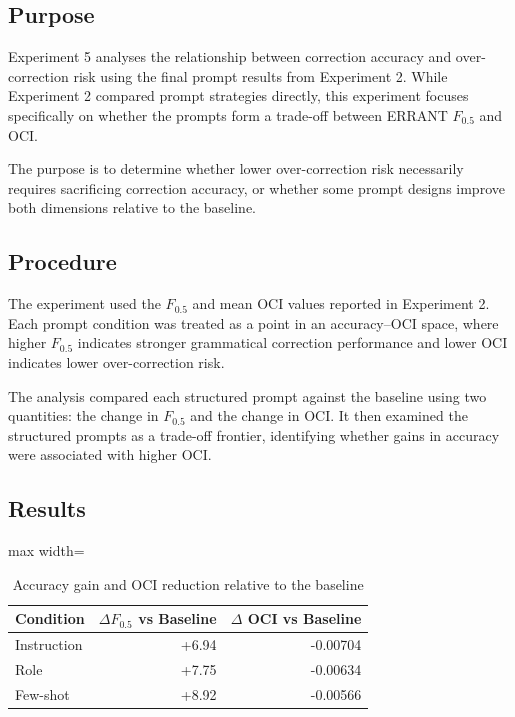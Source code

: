 \subsection{Purpose}

Experiment 5 analyses the relationship between correction accuracy and over-correction risk using the final prompt results from Experiment 2. While Experiment 2 compared prompt strategies directly, this experiment focuses specifically on whether the prompts form a trade-off between ERRANT $F_{0.5}$ and OCI.

The purpose is to determine whether lower over-correction risk necessarily requires sacrificing correction accuracy, or whether some prompt designs improve both dimensions relative to the baseline.

\subsection{Procedure}

The experiment used the $F_{0.5}$ and mean OCI values reported in Experiment 2. Each prompt condition was treated as a point in an accuracy--OCI space, where higher $F_{0.5}$ indicates stronger grammatical correction performance and lower OCI indicates lower over-correction risk.

The analysis compared each structured prompt against the baseline using two quantities: the change in $F_{0.5}$ and the change in OCI. It then examined the structured prompts as a trade-off frontier, identifying whether gains in accuracy were associated with higher OCI.

\subsection{Results}

\begin{table}[htbp]
    \centering
    \caption{Accuracy gain and OCI reduction relative to the baseline}
    \label{tab:exp5_baseline_deltas}
    \renewcommand{\arraystretch}{1.15}
    \begin{adjustbox}{max width=\textwidth}
    \begin{tabular}{lrr}
        \toprule
        \textbf{Condition} & \textbf{$\Delta F_{0.5}$ vs Baseline} & \textbf{$\Delta$ OCI vs Baseline} \\
        \midrule
        Instruction & +6.94 & -0.00704 \\
        Role        & +7.75 & -0.00634 \\
        Few-shot    & +8.92 & -0.00566 \\
        \bottomrule
    \end{tabular}
    \end{adjustbox}
\end{table}


